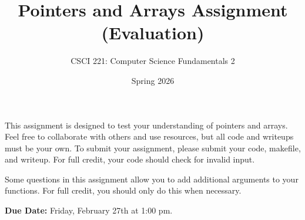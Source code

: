 \documentclass{exam}
\begin{document}
\title{Pointers and Arrays Assignment (Evaluation)}
\author{CSCI 221: Computer Science Fundamentals 2}
\date{Spring 2026}
\maketitle


This assignment is designed to test your understanding of pointers and arrays. 
Feel free to collaborate with others and use resources, but all code and writeups must be your own. 
To submit your assignment, please submit your code, makefile, and writeup. 
For full credit, your code should check for invalid input. 

Some questions in this assignment allow you to add additional arguments to your functions. 
For full credit, you should only do this when necessary. 

\textbf{Due Date:}
Friday, February 27th at 1:00 pm. 
\end{document}
